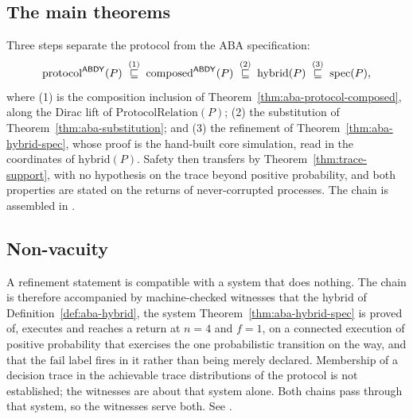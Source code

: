 


\subsection{The main theorems}

Three steps separate the protocol from the ABA specification:
\[
  \mathrm{protocol}^{\mathsf{ABDY}}(P)
  \;\overset{\text{(1)}}{\sqsubseteq}\; \mathrm{composed}^{\mathsf{ABDY}}(P)
  \;\overset{\text{(2)}}{\sqsubseteq}\; \mathrm{hybrid}(P)
  \;\overset{\text{(3)}}{\sqsubseteq}\; \mathrm{spec}(P),
\]
where (1) is the composition inclusion of Theorem~\ref{thm:aba-protocol-composed}, along the Dirac lift of $\mathrm{ProtocolRelation}(P)$; (2) the substitution of Theorem~\ref{thm:aba-substitution}; and (3) the refinement of Theorem~\ref{thm:aba-hybrid-spec}, whose proof is the hand-built core simulation, read in the coordinates of $\mathrm{hybrid}(P)$.
Safety then transfers by Theorem~\ref{thm:trace-support}, with no hypothesis on the trace beyond positive probability, and both properties are stated on the returns of never-corrupted processes.
The chain is assembled in .




\subsection{Non-vacuity}

A refinement statement is compatible with a system that does nothing.
The chain is therefore accompanied by machine-checked witnesses that the hybrid of Definition~\ref{def:aba-hybrid}, the system Theorem~\ref{thm:aba-hybrid-spec} is proved of, executes and reaches a return at $n = 4$ and $f = 1$, on a connected execution of positive probability that exercises the one probabilistic transition on the way, and that the $\mathrm{fail}$ label fires in it rather than being merely declared.
Membership of a decision trace in the achievable trace distributions of the protocol is not established; the witnesses are about that system alone.
Both chains pass through that system, so the witnesses serve both.
See .

